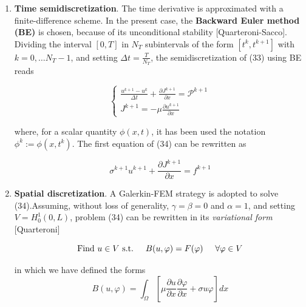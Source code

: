 \documentclass[a4paper]{article}
\begin{document}
\begin{enumerate}
	\item \textbf{Time semidiscretization}. The time derivative is approximated with a finite-difference scheme. In the present case, the \textbf{Backward Euler method (BE)} is chosen, because of its unconditional stability [Quarteroni-Sacco]. Dividing the interval $[0,T]$ in $N_T$ subintervals of the form $[t^k, t^{k+1}]$ with $ k=0, \dots N_T-1$, and setting $\Delta t = \frac{T}{N_T} $, the semidiscretization of (33) using BE reads
	
	\begin{equation}
	\begin{cases}
	\frac{u^{k+1} - u^k}{\Delta t} +\frac{\partial J^{k+1}}{\partial x} = \mathcal{P}^{k+1}  \\
	J^{k+1} =  - \mu \frac{\partial u^{k+1}}{\partial x} 
	\end{cases}
	\end{equation}
	 
	where, for a scalar quantity $\phi(x,t)$, it has been used the notation $ \phi^k := \phi(x,t^k) $. The first equation of (34) can be rewritten as
	
	\begin{equation}
	\sigma ^{k+1} u^{k+1} +\frac{\partial J^{k+1}}{\partial x} = f^{k+1} 
	\end{equation}
	
	\item \textbf{Spatial discretization}. A Galerkin-FEM strategy is adopted to solve (34).Assuming, without loss of generality, $\gamma = \beta = 0$ and $\alpha =1$, and setting $V = H_0^1(0,L)$,  problem (34) can be rewritten in its \textit{variational form} [Quarteroni]
	
	\begin{equation}
	\text{Find $u \in V$ s.t.} \hspace{0.5cm} B(u,\varphi) = F(\varphi) \hspace{0.5cm} \forall \varphi \in V
	\end{equation}
	
	in which we have defined the forms
	\begin{equation}
	B(u,\varphi) = \int_{\Omega}\left[\mu \frac{\partial u}{\partial x}  \frac{\partial \varphi}{\partial x} + \sigma u \varphi \right]  dx
	\end{equation}
	

\end{enumerate}
\end{document}
